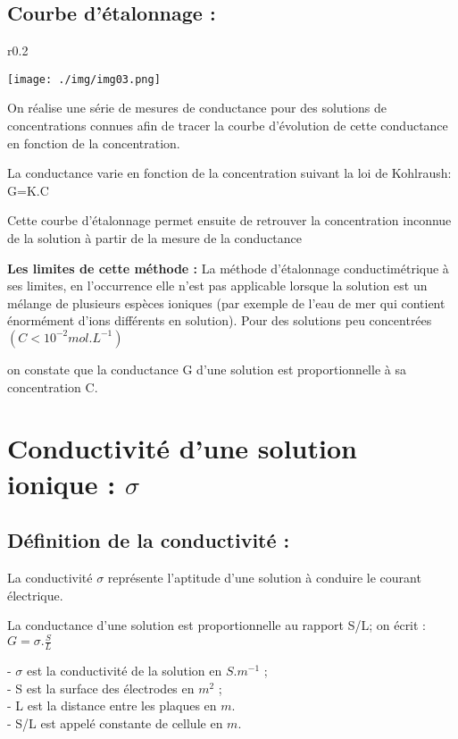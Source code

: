 \documentclass[12pt]{article}
\begin{document}
\subsection{Courbe d’étalonnage : }
\begin{wrapfigure}{r}{0.2\textwidth}

\texttt{[image: ./img/img03.png]}

\end{wrapfigure}

On réalise une série de mesures de conductance pour des
solutions de concentrations connues afin de tracer la courbe
d'évolution de cette conductance en fonction de la
concentration.

La conductance varie en fonction de la concentration suivant
la loi de Kohlraush: G=K.C

Cette courbe d'étalonnage permet ensuite de retrouver la concentration inconnue de la solution à partir de la mesure de la conductance

\textbf{Les limites de cette méthode :} La méthode d’étalonnage conductimétrique à ses limites, en l’occurrence elle n’est pas applicable lorsque la solution est un mélange de plusieurs espèces ioniques (par exemple de l’eau de mer qui contient énormément d’ions différents en solution).  Pour des solutions peu concentrées $(C < 10^{-2} mol.L^{-1} )$

on constate que la conductance G d’une solution est proportionnelle à sa concentration C.

\section{ Conductivité d’une solution ionique : $\sigma$}
\subsection{Définition de la conductivité : }
La conductivité $\sigma$ représente l’aptitude d’une solution à conduire le courant électrique.

La conductance d’une solution est proportionnelle au rapport S/L; on écrit : $G=\sigma.\frac{S}{L}$

- $\sigma$ est la conductivité de la solution en $S.m^{-1}$ ;
\\- S est la surface des électrodes en $m^2$ ;
\\- L est la distance entre les plaques en $m$.
\\- S/L est appelé constante de cellule en $m$.
\end{document}
